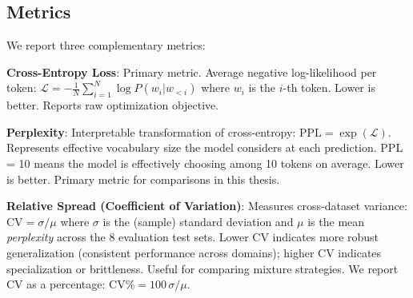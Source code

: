 \subsection{Metrics}

We report three complementary metrics:

\textbf{Cross-Entropy Loss}: Primary metric. Average negative log-likelihood per token: $\mathcal{L} = -\frac{1}{N}\sum_{i=1}^{N} \log P(w_i | w_{<i})$ where $w_i$ is the $i$-th token. Lower is better. Reports raw optimization objective.

\textbf{Perplexity}: Interpretable transformation of cross-entropy: $\text{PPL} = \exp(\mathcal{L})$. Represents effective vocabulary size the model considers at each prediction. PPL = 10 means the model is effectively choosing among 10 tokens on average. Lower is better. Primary metric for comparisons in this thesis.

\textbf{Relative Spread (Coefficient of Variation)}: Measures cross-dataset variance: $\text{CV} = \sigma / \mu$ where $\sigma$ is the (sample) standard deviation and $\mu$ is the mean \emph{perplexity} across the 8 evaluation test sets. Lower CV indicates more robust generalization (consistent performance across domains); higher CV indicates specialization or brittleness. Useful for comparing mixture strategies. We report CV as a percentage: $\text{CV}\% = 100\,\sigma/\mu$.

